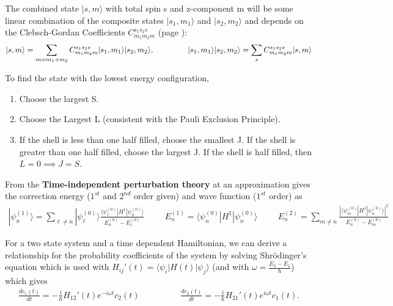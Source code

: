 The combined state $| s, m \rangle$  with total spin s and z-component m will be some linear combination of the composite states $| s_1, m_1 \rangle$ and $| s_2, m_2 \rangle$ and depends on the Clebsch-Gordan Coefficients $C_{m_1m_2m}^{s_1s_2s}$ (page \pageref{Clebsch-Gordan}):
\begin{align}
| s, m \rangle = \sum_{m=m_1+m_2} C_{m_1m_2m}^{s_1s_2s}| s_1, m_1 \rangle| s_2, m_2 \rangle, \hspace{1.5cm} | s_1, m_1 \rangle| s_2, m_2 \rangle = \sum_{s} C_{m_1m_2m}^{s_1s_2s}| s, m \rangle
\end{align}

\begin{fancybox}{}
To find the state with the lowest energy configuration,
	\begin{enumerate}
		\item Choose the largest S.
		\item Choose the Largest L (consistent with the Pauli Exclusion Principle).
		\item If the shell is less than one half filled, choose the smallest J. If the shell is greater than one half filled, choose the largest J. If the shell is half filled, then $L=0 \implies J=S$.
	\end{enumerate}
\end{fancybox}

From the \textbf{Time-independent perturbation theory} at an approximation gives the correction energy ($1^{st}$ and $2^{nd}$ order given) and wave function ($1^{st}$ order) as
\begin{align}
	| \psi_n^{(1)} \rangle = \sum_{\ell \neq n} | \psi_\ell^{(0)} \rangle \frac{\langle \psi_\ell^{(0)}|H^1| \psi_n^{(0)} \rangle }{E_n^{(0)}-E_\ell^{(0)}} \hspace{1cm} E_n^{(1)}=\langle \psi_n^{(0)}|H^1| \psi_n^{(0)}\rangle  \hspace{1cm} E_n^{(2)} = \sum_{m \neq n} \frac{|\langle \psi_m^{(0)}|H^1| \psi_n^{(0)} \rangle|^2 }{E_n^{(0)}-E_m^{(0)}}  
\end{align}

For a two state system and a time dependent Hamiltonian, we can derive a relationship for the probability coefficients of the system by solving Shr\"{o}dinger's equation which is used with $H_{ij}'(t)=\langle \psi_i|H(t)|\psi_j\rangle$ (and with $\omega = \frac{E_2-E_1}{\hbar}$) which gives
\begin{align}
	\frac{dc_1(t)}{dt} = -\frac{i}{\hbar}H_{12}'(t)e^{-i \omega t}c_2(t) \hspace{2cm} 	\frac{dc_2(t)}{dt} = -\frac{i}{\hbar}H_{21}'(t)e^{i \omega t}c_1(t).
\end{align}

